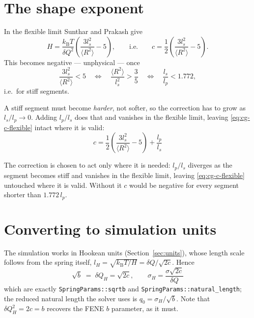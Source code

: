 \documentclass[11pt,a4paper]{report}
\newcommand{\kB}{k_\mathrm{B}}
\newcommand{\code}[1]{\texttt{\seqsplitcode{#1}}}
\newcommand{\seqsplitcode}[1]{#1}
\begin{document}
\section{The shape exponent}
\label{sec:cg-exponent}

In the flexible limit Sunthar and Prakash give
\begin{equation}
  H = \frac{\kB T}{\delta Q^{2}}\left(\frac{3 l_s^{2}}{\langle R^{2}\rangle} - 5\right),
  \qquad\text{i.e.}\qquad
  c = \frac{1}{2}\left(\frac{3 l_s^{2}}{\langle R^{2}\rangle} - 5\right).
  \label{eq:cg-c-flexible}
\end{equation}
This becomes negative --- unphysical --- once
\begin{equation}
  \frac{3 l_s^{2}}{\langle R^{2}\rangle} < 5
  \quad\Longleftrightarrow\quad
  \frac{\langle R^{2}\rangle}{l_s^{2}} > \frac{3}{5}
  \quad\Longleftrightarrow\quad
  \frac{l_s}{l_p} < 1.772 ,
  \label{eq:cg-negative}
\end{equation}
i.e.\ for stiff segments.

A stiff segment must become \emph{harder}, not softer, so the correction has to
grow as $l_s/l_p \to 0$. Adding $l_p/l_s$ does that and vanishes in the flexible
limit, leaving \eqref{eq:cg-c-flexible} intact where it is valid:
\begin{equation}
  \boxed{\;
  c = \frac{1}{2}\left(\frac{3 l_s^{2}}{\langle R^{2}\rangle} - 5\right)
      + \frac{l_p}{l_s}\;}
  \label{eq:cg-c}
\end{equation}

The correction is chosen to act only where it is needed: $l_p/l_s$ diverges as the
segment becomes stiff and vanishes in the flexible limit, leaving
\eqref{eq:cg-c-flexible} untouched where it is valid. Without it $c$ would be
negative for every segment shorter than $1.772\,l_p$.

\section{Converting to simulation units}

The simulation works in Hookean units (Section~\ref{sec:units}), whose length scale
follows from the spring itself, $l_H = \sqrt{\kB T/H} = \delta Q/\sqrt{2c}$. Hence
\begin{equation}
  \boxed{\;
  \sqrt{b} \;=\; \delta Q_H = \sqrt{2c},
  \qquad
  \sigma_H = \frac{\sigma\sqrt{2c}}{\delta Q}\;}
  \label{eq:cg-hookean}
\end{equation}
which are exactly \code{SpringParams::sqrtb} and
\code{SpringParams::natural\_length}; the reduced natural length the solver uses is
$q_0 = \sigma_H/\sqrt{b}$. Note that $\delta Q_H^{2} = 2c = b$ recovers the FENE
$b$ parameter, as it must.
\end{document}
